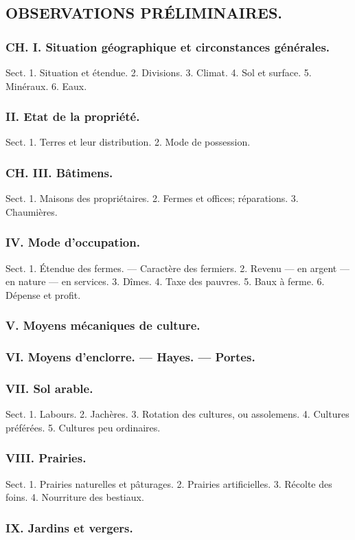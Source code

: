 \subsection{OBSERVATIONS PRÉLIMINAIRES.}
\subsubsection{CH. I. Situation géographique et circonstances générales.}
Sect. 1. Situation et étendue.
2. Divisions.
3. Climat.
4. Sol et surface.
5. Minéraux.
6. Eaux.
\subsubsection{II. Etat de la propriété.}
Sect. 1. Terres et leur distribution.
2. Mode de possession.
\setcounter{page}{340}
\subsubsection{CH. III. Bâtimens.}
Sect. 1. Maisons des propriétaires.
2. Fermes et offices; réparations.
3. Chaumières.
\subsubsection{IV. Mode d'occupation.}
Sect. 1. Étendue des fermes. — Caractère des fermiers.
2. Revenu — en argent — en nature — en services.
3. Dîmes.
4. Taxe des pauvres.
5. Baux à ferme.
6. Dépense et profit.
\subsubsection{V. Moyens mécaniques de culture.}
\subsubsection{VI. Moyens d'enclorre. — Hayes. — Portes.}
\subsubsection{VII. Sol arable.}
Sect. 1. Labours.
2. Jachères.
3. Rotation des cultures, ou assolemens.
4. Cultures préférées.
5. Cultures peu ordinaires.
\subsubsection{VIII. Prairies.}
Sect. 1. Prairies naturelles et pâturages.
2. Prairies artificielles.
3. Récolte des foins.
4. Nourriture des bestiaux.
\subsubsection{IX. Jardins et vergers.}
\setcounter{page}{341}
